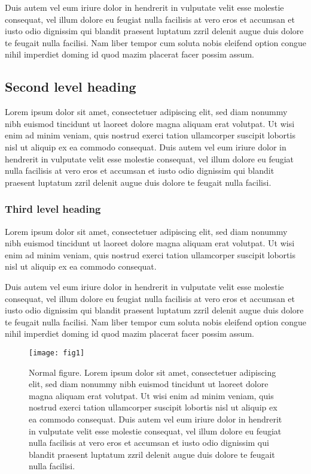 \documentclass{dsj}
\begin{document}
Duis autem vel eum iriure dolor in hendrerit in vulputate velit esse molestie consequat, vel illum dolore eu feugiat nulla facilisis at vero eros et accumsan et iusto odio dignissim qui blandit praesent luptatum zzril delenit augue duis dolore te \citep{bib4} feugait nulla facilisi. Nam liber tempor cum soluta nobis eleifend option congue nihil imperdiet doming id quod mazim placerat facer possim assum.

\subsection{Second level heading}

Lorem ipsum dolor sit amet, consectetuer adipiscing elit, sed diam nonummy nibh euismod tincidunt ut laoreet dolore magna aliquam erat volutpat. Ut wisi enim ad minim veniam, quis nostrud exerci tation ullamcorper suscipit lobortis nisl ut aliquip ex ea commodo consequat. Duis autem vel eum iriure dolor in hendrerit in vulputate velit esse molestie consequat, vel illum dolore eu feugiat nulla facilisis at vero eros et accumsan et iusto odio dignissim qui blandit praesent luptatum zzril delenit augue duis dolore te feugait nulla facilisi.

\subsubsection{Third level heading}
Lorem ipsum dolor sit amet, consectetuer adipiscing elit, sed diam nonummy nibh euismod tincidunt ut laoreet dolore magna aliquam erat volutpat. Ut wisi enim ad minim veniam, quis nostrud exerci tation ullamcorper suscipit lobortis nisl ut aliquip ex ea commodo consequat.

Duis autem vel eum iriure dolor in hendrerit in vulputate velit esse molestie consequat, vel illum dolore eu feugiat nulla facilisis at vero eros et accumsan et iusto odio dignissim qui blandit praesent luptatum zzril delenit augue duis dolore te feugait nulla facilisi. Nam liber tempor cum soluta nobis eleifend option congue nihil imperdiet doming id quod mazim placerat facer possim assum.

\begin{figure}
\texttt{[image: fig1]}
\caption{\label{fig1}Normal figure. Lorem ipsum dolor sit amet, consectetuer adipiscing elit, sed diam nonummy nibh euismod tincidunt ut laoreet dolore magna aliquam erat volutpat. Ut wisi enim ad minim veniam, quis nostrud exerci tation ullamcorper suscipit lobortis nisl ut aliquip ex ea commodo consequat. Duis autem vel eum iriure dolor in hendrerit in vulputate velit esse molestie consequat, vel illum dolore eu feugiat nulla facilisis at vero eros et accumsan et iusto odio dignissim qui blandit praesent luptatum zzril delenit augue duis dolore te feugait nulla facilisi.}
\end{figure}
\end{document}
